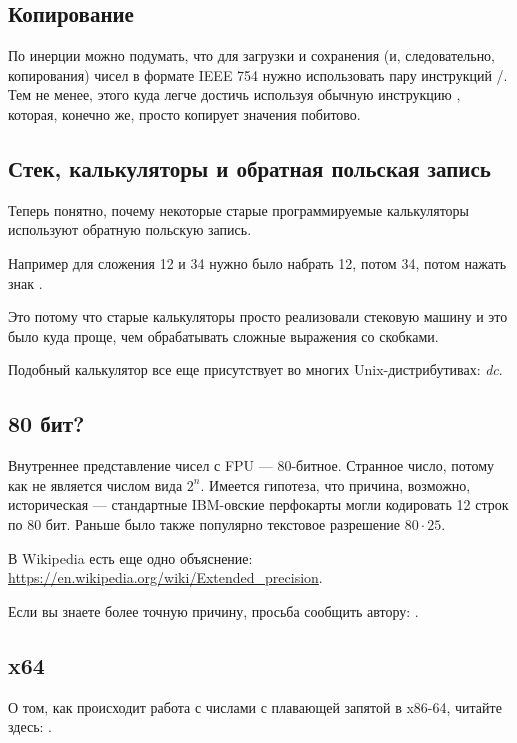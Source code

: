 \subsection{Копирование}

По инерции можно подумать, что для загрузки и сохранения (и, следовательно, копирования) чисел в формате
IEEE 754 нужно использовать пару инструкций /.
Тем не менее, этого куда легче достичь используя обычную инструкцию ,
которая, конечно же, просто копирует значения побитово.

\subsection{Стек, калькуляторы и обратная польская запись}

Теперь понятно, почему некоторые старые программируемые калькуляторы используют обратную польскую запись.

Например для сложения 12 и 34 нужно было набрать 12, потом 34, потом нажать знак .

Это потому что старые калькуляторы просто реализовали стековую машину и это было куда проще, чем обрабатывать сложные выражения со скобками.

Подобный калькулятор все еще присутствует во многих Unix-дистрибутивах: \emph{dc}.

\subsection{80 бит?}

Внутреннее представление чисел с FPU --- 80-битное.
Странное число, потому как не является числом вида $2^n$.
Имеется гипотеза, что причина, возможно, историческая --- стандартные IBM-овские перфокарты могли кодировать 12 строк по 80 бит.
Раньше было также популярно текстовое разрешение $80 \cdot 25$.

В Wikipedia есть еще одно объяснение: \url{https://en.wikipedia.org/wiki/Extended_precision}.

Если вы знаете более точную причину, просьба сообщить автору: \EMAILS{}.

\subsection{x64}

О том, как происходит работа с числами с плавающей запятой в x86-64, читайте здесь: .




